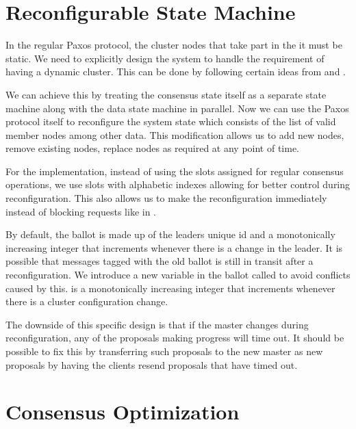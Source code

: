 \section{Reconfigurable State Machine}
\label{section:a.n.d.reconfig}

In the regular Paxos protocol, the cluster nodes that take part in the
it must be static. We need to explicitly design the system to handle
the requirement  of having a dynamic cluster.
This can be done by
following certain ideas from \citet{LamportSP08} and \citet{LamportMZ10}.

We can achieve this by treating the consensus state itself as a separate
state machine along with the data state machine in parallel. Now we can use
the Paxos protocol itself to reconfigure the system state which consists
of the list of valid member nodes among other data. This modification allows
us to add new nodes, remove existing nodes, replace nodes as required at any
point of time.

For the implementation, instead of using the slots assigned for regular
consensus operations, we use slots with
alphabetic indexes allowing for better control during reconfiguration. This also
allows us to make the reconfiguration immediately instead of blocking requests
like in \citet{LamportSP08}.

By default, the ballot%
 is made up of the leaders unique id and a monotonically
increasing
integer that increments whenever there is a change in the leader. It is possible
that messages tagged with the old ballot is still in transit after a
reconfiguration. We introduce a new variable in the ballot called  to
avoid conflicts caused by this.  is a monotonically
increasing integer that increments whenever there is a cluster
configuration change.

The downside of this specific design is that if the master changes during
reconfiguration, any of the proposals making progress will time out. It
should be possible to fix this by transferring such proposals to the new master
as new proposals by having the clients resend proposals that have timed out.

\section{Consensus Optimization}
\label{section:consensus.optimization}

